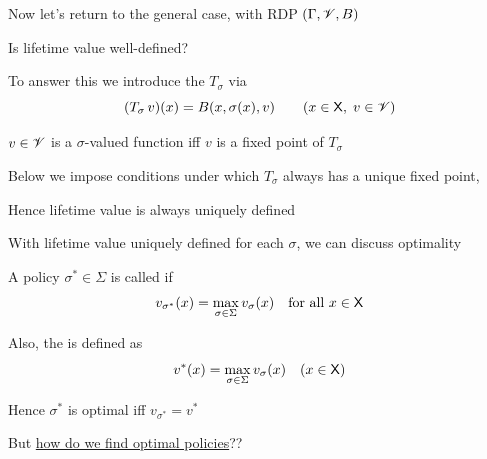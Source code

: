 \begin{frame}

    Now let's return to the general case, with RDP $(\Gamma, \mathscr V, B)$

        \vspace{0.5em}
        \vspace{0.5em}
    Is lifetime value well-defined?
        \vspace{0.5em}
        \vspace{0.5em}

    To answer this we introduce the  $T_\sigma$ via
    \begin{equation*}
        (T_\sigma \, v)(x) = B(x, \sigma(x), v)
        \qquad (x \in \mathsf X,\; v \in \mathscr V)
    \end{equation*}

     $v \in \mathscr V$ is a $\sigma$-valued function iff $v$ is a fixed point of
    $T_\sigma$
    
        \vspace{0.5em}
        \vspace{0.5em}

    Below we impose conditions under which $T_\sigma$ always has a unique
    fixed point, 

        \vspace{0.5em}
        \vspace{0.5em}
    Hence lifetime value is always uniquely defined


\end{frame}


\begin{frame}
    
    With lifetime value uniquely defined for each $\sigma$, we can discuss
    optimality

        \vspace{0.5em}
        \vspace{0.5em}
    A policy $\sigma^* \in \Sigma$ is called  if
    \begin{equation*}
        v_{\sigma^*}(x) = \max_{\sigma \in \Sigma} v_\sigma(x)
        \quad \text{for all } x \in \mathsf X
    \end{equation*}

        \vspace{0.5em}
        \vspace{0.5em}
    Also, the  is defined as 
    \begin{equation*}
        v^*(x) = \max_{\sigma \in \Sigma} v_\sigma(x)
        \quad (x \in \mathsf X)
    \end{equation*}

        \vspace{0.5em}
        \vspace{0.5em}
    Hence $\sigma^*$ is optimal iff $v_{\sigma^*} = v^*$

        \vspace{0.5em}
        \vspace{0.5em}

    But \underline{how do we find optimal policies}??

\end{frame}


